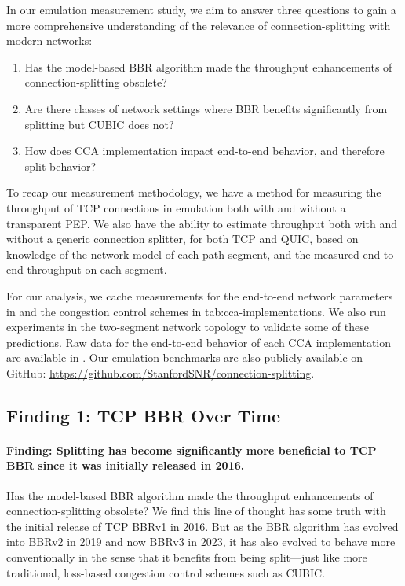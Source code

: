 

In our emulation measurement study, we aim to answer three questions to gain a
more comprehensive understanding of the relevance of connection-splitting with
modern networks:

\begin{enumerate}[noitemsep]
    \item Has the model-based BBR algorithm made the throughput enhancements of
     connection-splitting obsolete?
    \item Are there classes of network settings where BBR benefits significantly
     from splitting but CUBIC does not?
    \item How does CCA implementation impact end-to-end behavior, and therefore split
     behavior?
\end{enumerate}

\noindent To recap our measurement methodology, we have a method for
 measuring the throughput of TCP connections in emulation both with and without a
 transparent PEP. We also have the ability to estimate throughput both with and
 without a generic connection splitter, for both TCP and QUIC, based on
 knowledge of the network model of each path segment, and the measured end-to-end
 throughput on each segment.

For our analysis, we cache measurements for the end-to-end network parameters
in  and the congestion control schemes in \Cref
{tab:cca-implementations}. We also run experiments in the two-segment network topology
to validate some of these predictions. Raw data for the end-to-end
behavior of each CCA implementation are available in .
Our emulation benchmarks are also publicly available on GitHub: \url{https://github.com/StanfordSNR/connection-splitting}.

\subsection{Finding 1: TCP BBR Over Time}
\label{sec:splitting:results:finding1}

\paragraph{Finding: Splitting has become significantly more beneficial to TCP
 BBR since it was initially released in 2016.}

Has the model-based BBR algorithm made the throughput enhancements of
connection-splitting obsolete? We find this line of thought has some truth
with the initial release of TCP BBRv1 in 2016. But as the BBR algorithm has
evolved into BBRv2 in 2019 and now BBRv3 in 2023, it has also evolved to behave
more conventionally in the sense that it benefits from being split---just like
more traditional, loss-based congestion control schemes such as CUBIC.

